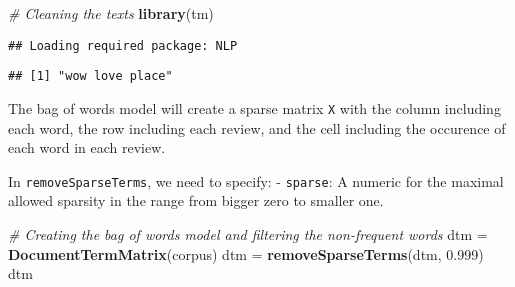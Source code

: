 \documentclass[]{article}
\newenvironment{Shaded}{\begin{snugshade}}{\end{snugshade}}
\newcommand{\CommentTok}[1]{\textcolor[rgb]{0.56,0.35,0.01}{\textit{#1}}}
\newcommand{\DecValTok}[1]{\textcolor[rgb]{0.00,0.00,0.81}{#1}}
\newcommand{\FloatTok}[1]{\textcolor[rgb]{0.00,0.00,0.81}{#1}}
\newcommand{\KeywordTok}[1]{\textcolor[rgb]{0.13,0.29,0.53}{\textbf{#1}}}
\newcommand{\NormalTok}[1]{#1}
\newcommand{\OperatorTok}[1]{\textcolor[rgb]{0.81,0.36,0.00}{\textbf{#1}}}
\newcommand{\StringTok}[1]{\textcolor[rgb]{0.31,0.60,0.02}{#1}}
\begin{document}
\begin{Shaded}
\begin{Highlighting}[]
\CommentTok{# Cleaning the texts}
\KeywordTok{library}\NormalTok{(tm)}
\end{Highlighting}
\end{Shaded}

\begin{verbatim}
## Loading required package: NLP
\end{verbatim}

\begin{Shaded}
\end{Shaded}

\begin{verbatim}
## [1] "wow love place"
\end{verbatim}

The bag of words model will create a sparse matrix \texttt{X} with the
column including each word, the row including each review, and the cell
including the occurence of each word in each review.

In \texttt{removeSparseTerms}, we need to specify: - \texttt{sparse}: A
numeric for the maximal allowed sparsity in the range from bigger zero
to smaller one.

\begin{Shaded}
\begin{Highlighting}[]
\CommentTok{# Creating the bag of words model and filtering the non-frequent words}
\NormalTok{dtm =}\StringTok{ }\KeywordTok{DocumentTermMatrix}\NormalTok{(corpus)}
\NormalTok{dtm =}\StringTok{ }\KeywordTok{removeSparseTerms}\NormalTok{(dtm, }\FloatTok{0.999}\NormalTok{)}
\NormalTok{dtm}
\end{Highlighting}
\end{Shaded}
\end{document}
